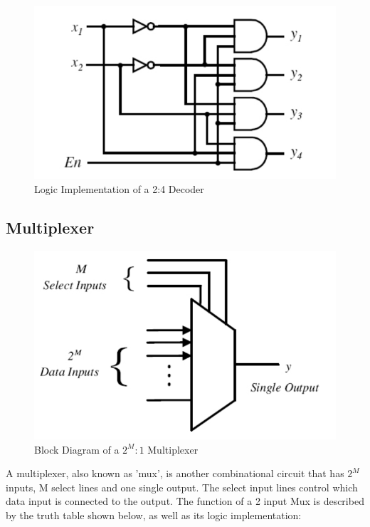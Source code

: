 \begin{figure}[H]
  \begin{centering}
  \includegraphics[scale=1]{data/decoderlogic.png}
  \par\end{centering}
  \caption{Logic Implementation of a 2:4 Decoder}
\end{figure}


\subsection*{Multiplexer}

\begin{figure}[H]
  \begin{centering}
  \includegraphics[scale=1]{data/muxB.png}
  \par\end{centering}
  \caption{Block Diagram of a $2^{M}:1$ Multiplexer}
\end{figure}

A multiplexer, also known as 'mux', is another combinational circuit that has $2^{M}$ inputs, M select lines and one single output. The select input lines control which data input is connected to the output. The function of a 2 input Mux is described by the truth table shown below, as well as its logic implementation:


